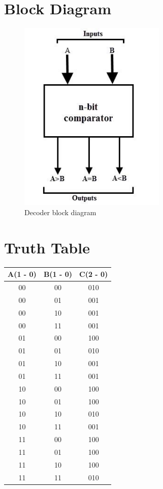 \documentclass[titlepage]{article}
\begin{document}
    \section{Block Diagram} 
    \begin{figure}[!ht]
        \centering
        \includegraphics[width=7cm]{./figures/comparator_block_diagram.jpg}
        \caption{Decoder block diagram}
    \end{figure}


    \section{Truth Table}
    \begin{tabular}{| c | c | c |}
        \hline
        A(1 - 0) & B(1 - 0) & C(2 - 0)\\
        \hline
        00 & 00 & 010 \\
        00 & 01 & 001 \\
        00 & 10 & 001 \\
        00 & 11 & 001 \\
        01 & 00 & 100 \\
        01 & 01 & 010 \\
        01 & 10 & 001 \\
        01 & 11 & 001 \\
        10 & 00 & 100 \\
        10 & 01 & 100 \\
        10 & 10 & 010 \\
        10 & 11 & 001 \\
        11 & 00 & 100 \\
        11 & 01 & 100 \\
        11 & 10 & 100 \\
        11 & 11 & 010 \\
        \hline
    \end{tabular}
\end{document}
